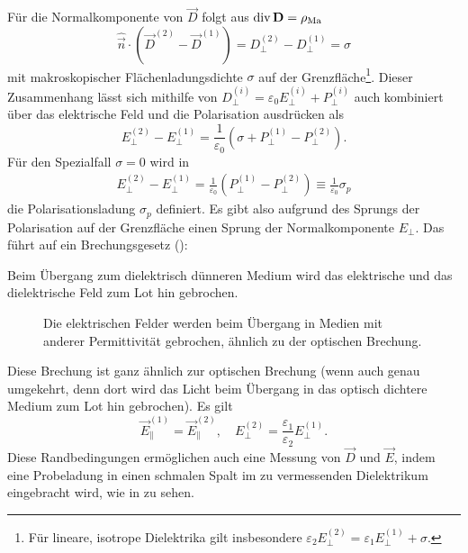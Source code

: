Für die Normalkomponente von $\vec {D}$ folgt aus $\operatorname{div} \mathbf{D}=\rho _{\mathrm{Ma}}$
\begin{equation*}
	\hat{\vec {n}}\cdot \left(\vec {D}^{\left(2\right)}-\vec {D}^{\left(1\right)}\right)=D_{\perp }^{\left(2\right)}-D_{\perp }^{\left(1\right)}=\sigma
\end{equation*}
mit makroskopischer Flächenladungsdichte $\sigma $ auf der Grenzfläche\footnote{Für lineare, isotrope Dielektrika gilt insbesondere $\varepsilon _{2}E_{\perp }^{\left(2\right)}=\varepsilon _{1}E_{\perp }^{\left(1\right)}+\sigma .$}. Dieser Zusammenhang lässt sich mithilfe von $D_{\perp }^{\left(i\right)}=\varepsilon _{0}E_{\perp }^{\left(i\right)}+P_{\perp }^{\left(i\right)}$ auch kombiniert über das elektrische Feld und die Polarisation ausdrücken als
\begin{equation*}
	E_{\perp }^{\left(2\right)}-E_{\perp }^{\left(1\right)}=\frac{1}{\varepsilon _{0}}\left(\sigma +P_{\perp }^{\left(1\right)}-P_{\perp }^{\left(2\right)}\right).
\end{equation*}
Für den Spezialfall $\sigma =0$ wird in
\begin{align*}
	E_{\perp }^{\left(2\right)}-E_{\perp }^{\left(1\right)}=\frac{1}{\varepsilon _{0}}\left(P_{\perp }^{\left(1\right)}-P_{\perp }^{\left(2\right)}\right)\equiv \frac{1}{\varepsilon _{0}}\sigma _{p}
\end{align*}
die Polarisationsladung $\sigma _{p}$ definiert. Es gibt also aufgrund des Sprungs der Polarisation auf der Grenzfläche einen Sprung der Normalkomponente $E_{\perp }$. Das führt auf ein Brechungsgesetz ():

\begin{formal}
	Beim Übergang zum dielektrisch dünneren Medium wird das elektrische und das dielektrische Feld zum Lot hin gebrochen.
\end{formal}



\begin{figure}[htb]
	\centering
	\tfigDielektrischeBrechung
	\caption{Die elektrischen Felder werden beim Übergang in Medien mit anderer Permittivität gebrochen, ähnlich zu der optischen Brechung. }
	\label{fig:dielectric_refraction}
\end{figure}

Diese Brechung ist ganz ähnlich zur optischen Brechung (wenn auch genau umgekehrt, denn dort wird das Licht beim Übergang in das optisch dichtere Medium zum Lot hin gebrochen). Es gilt
\begin{equation*}
	\vec {E}_{\parallel }^{\left(1\right)}=\vec {E}_{\parallel }^{\left(2\right)},\quad E_{\perp }^{\left(2\right)}=\frac{\varepsilon _{1}}{\varepsilon _{2}}E_{\perp }^{\left(1\right)}.
\end{equation*}
Diese Randbedingungen ermöglichen auch eine Messung von $\vec {D}$ und $\vec {E}$, indem eine Probeladung in einen schmalen Spalt im zu vermessenden Dielektrikum eingebracht wird, wie in  zu sehen.

